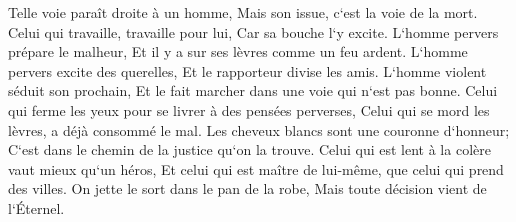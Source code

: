 \verse Telle voie paraît droite à un homme, Mais son issue, c`est la voie de la mort. 
\verse Celui qui travaille, travaille pour lui, Car sa bouche l`y excite. 
\verse L`homme pervers prépare le malheur, Et il y a sur ses lèvres comme un feu ardent. 
\verse L`homme pervers excite des querelles, Et le rapporteur divise les amis. 
\verse L`homme violent séduit son prochain, Et le fait marcher dans une voie qui n`est pas bonne. 
\verse Celui qui ferme les yeux pour se livrer à des pensées perverses, Celui qui se mord les lèvres, a déjà consommé le mal. 
\verse Les cheveux blancs sont une couronne d`honneur; C`est dans le chemin de la justice qu`on la trouve. 
\verse Celui qui est lent à la colère vaut mieux qu`un héros, Et celui qui est maître de lui-même, que celui qui prend des villes. 
\verse On jette le sort dans le pan de la robe, Mais toute décision vient de l`Éternel. 

\chapter{}

